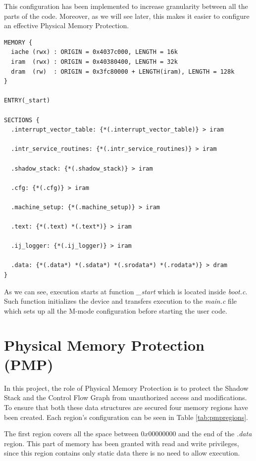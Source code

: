 This configuration has been implemented to increase granularity between all the parts
of the code. Moreover, as we will see later, this makes it easier to configure
an effective Physical Memory Protection.

\begin{lstlisting}[style=CStyle, caption= Simplified linker script, label={lst:linker}]
MEMORY {
  iache (rwx) : ORIGIN = 0x4037c000, LENGTH = 16k
  iram  (rwx) : ORIGIN = 0x40380400, LENGTH = 32k
  dram  (rw)  : ORIGIN = 0x3fc80000 + LENGTH(iram), LENGTH = 128k
}

ENTRY(_start)

SECTIONS {
  .interrupt_vector_table: {*(.interrupt_vector_table)} > iram

  .intr_service_routines: {*(.intr_service_routines)} > iram

  .shadow_stack: {*(.shadow_stack)} > iram

  .cfg: {*(.cfg)} > iram

  .machine_setup: {*(.machine_setup)} > iram

  .text: {*(.text) *(.text*)} > iram

  .ij_logger: {*(.ij_logger)} > iram

  .data: {*(.data*) *(.sdata*) *(.srodata*) *(.rodata*)} > dram
}
\end{lstlisting}

As we can see, execution starts at function \textit{\_start} which is located inside
\textit{boot.c}. Such function initializes the device and transfers execution to
the \textit{main.c} file which sets up all the M-mode configuration before
starting the user code.

\section{Physical Memory Protection (PMP)}
\label{sec:project_pmp}

In this project, the role of Physical Memory Protection is to protect the Shadow
Stack and the Control Flow Graph from unauthorized access and modifications. To ensure
that both these data structures are secured four memory regions have been created.
Each region's configuration can be seen in Table \ref{tab:pmpregions}.

The first region covers all the space between $0x00000000$ and the end of the
\textit{.data} region. This part of memory has been granted with read and write
privileges, since this region contains only static data there is no need to allow
execution.


